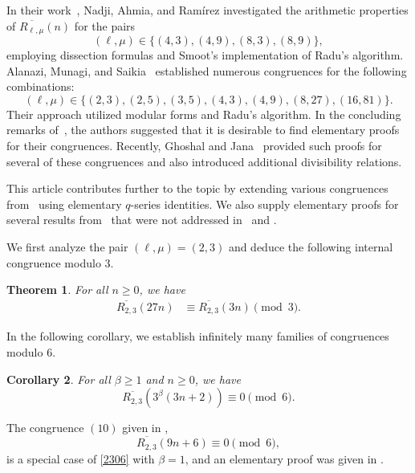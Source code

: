 \documentclass{amsart}
\newtheorem{theorem}{Theorem}[section]
\newtheorem{corollary}[theorem]{Corollary}
\theoremstyle{definition}
\begin{document}
In their work~\cite{Nadji-Ahmia-Ramirez}, Nadji, Ahmia, and Ramírez investigated the arithmetic properties of $\overline{R_{\ell,\mu}}(n)$ for the pairs
\[
(\ell,\mu) \in \{(4,3), (4,9), (8,3), (8,9)\},
\] 
employing dissection formulas and Smoot's implementation of Radu's algorithm. Alanazi, Munagi, and Saikia~\cite{Alanazi-Munagi-Saikia} established numerous congruences for the following combinations:
\[
(\ell,\mu) \in \{(2,3), (2,5), (3,5), (4,3), (4,9), (8,27), (16,81)\}.
\]
Their approach utilized modular forms and Radu's algorithm. In the concluding remarks of~\cite{Alanazi-Munagi-Saikia}, the authors suggested that it is desirable to find elementary proofs for their congruences. Recently, Ghoshal and Jana~\cite{Ghoshal-Jana} provided such proofs for several of these congruences and also introduced additional divisibility relations.

This article contributes further to the topic by extending various congruences from~\cite{Alanazi-Munagi-Saikia} using elementary $q$-series identities. We also supply elementary proofs for several results from~\cite{Alanazi-Munagi-Saikia} that were not 
addressed in~\cite{Ghoshal-Jana} and \cite{Nadji-Ahmia-Ramirez}.
		
We first analyze the pair $(\ell,\mu)=(2,3)$ and deduce the following internal congruence modulo $3$.
\begin{theorem}\label{T23}
    For all $n\geq0$, we have 
    \begin{align*}
        \overline{R_{2,3}}(27n)&\equiv  \overline{R_{2,3}}(3n) \pmod{3}.
        \end{align*}
\end{theorem}

In the following corollary, we establish infinitely many families of congruences modulo $6$.
\begin{corollary}\label{C23}
    For all $\beta\geq1$ and $n\geq0$, we have 
\begin{equation}\label{2306}
\overline{R_{2,3}}\left(3^\beta(3n+2)\right)\equiv0\pmod{6}.
    \end{equation}
\end{corollary}
The congruence $(10)$ given in \cite[Theorem 4.1]{Alanazi-Munagi-Saikia},
$$\overline{R_{2,3}}(9n+6)\equiv0\pmod{6},$$
is a special case of \eqref{2306} with $\beta=1$, and an elementary proof was given in \cite[Theorem 3.1]{Ghoshal-Jana}.
\end{document}
